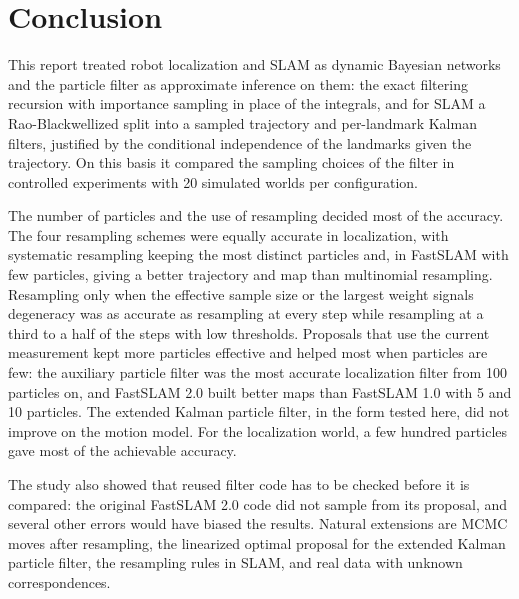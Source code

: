 \section{Conclusion}\label{sec:conclusion}

This report treated robot localization and SLAM as dynamic Bayesian networks and the particle filter as approximate
inference on them: the exact filtering recursion with importance sampling in place of the integrals, and for SLAM a
Rao-Blackwellized split into a sampled trajectory and per-landmark Kalman filters, justified by the conditional
independence of the landmarks given the trajectory. On this basis it compared the sampling choices of the filter in
controlled experiments with 20 simulated worlds per configuration.

The number of particles and the use of resampling decided most of the accuracy. The four resampling schemes were equally
accurate in localization, with systematic resampling keeping the most distinct particles and, in FastSLAM with few
particles, giving a better trajectory and map than multinomial resampling. Resampling only when the effective sample
size or the largest weight signals degeneracy was as accurate as resampling at every step while resampling at a third
to a half of the steps with low thresholds. Proposals that use the current measurement kept more particles effective
and helped most when particles are few: the auxiliary particle filter was the most accurate localization filter from
100 particles on, and FastSLAM 2.0 built better maps than FastSLAM 1.0 with 5 and 10 particles. The extended Kalman
particle filter, in the form tested here, did not improve on the motion model. For the localization world, a few hundred
particles gave most of the achievable accuracy.

The study also showed that reused filter code has to be checked before it is compared: the original FastSLAM 2.0 code
did not sample from its proposal, and several other errors would have biased the results. Natural extensions are MCMC
moves after resampling, the linearized optimal proposal for the extended Kalman particle filter, the resampling rules in
SLAM, and real data with unknown correspondences.
